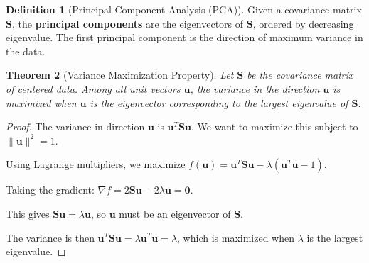 \documentclass[12pt]{article}
\numberwithin{equation}{section}
\newcommand{\vect}[1]{\boldsymbol{#1}}   %
\newcommand{\mat}[1]{\mathbf{#1}}        %
\theoremstyle{plain}
\newtheorem{theorem}{Theorem}[section]
\theoremstyle{definition}
\newtheorem{definition}[theorem]{Definition}
\theoremstyle{remark}
\begin{document}
\begin{definition}[Principal Component Analysis (PCA)]
Given a covariance matrix $\mat{S}$, the \textbf{principal components} are the eigenvectors of $\mat{S}$, ordered by decreasing eigenvalue. The first principal component is the direction of maximum variance in the data.
\end{definition}

\begin{theorem}[Variance Maximization Property]
Let $\mat{S}$ be the covariance matrix of centered data. Among all unit vectors $\vect{u}$, the variance in the direction $\vect{u}$ is maximized when $\vect{u}$ is the eigenvector corresponding to the largest eigenvalue of $\mat{S}$.
\end{theorem}

\begin{proof}
The variance in direction $\vect{u}$ is $\vect{u}^T\mat{S}\vect{u}$. We want to maximize this subject to $\|\vect{u}\|^2 = 1$.

Using Lagrange multipliers, we maximize $f(\vect{u}) = \vect{u}^T\mat{S}\vect{u} - \lambda(\vect{u}^T\vect{u} - 1)$.

Taking the gradient: $\nabla f = 2\mat{S}\vect{u} - 2\lambda\vect{u} = \vect{0}$.

This gives $\mat{S}\vect{u} = \lambda\vect{u}$, so $\vect{u}$ must be an eigenvector of $\mat{S}$.

The variance is then $\vect{u}^T\mat{S}\vect{u} = \lambda\vect{u}^T\vect{u} = \lambda$, which is maximized when $\lambda$ is the largest eigenvalue.
\end{proof}
\end{document}
